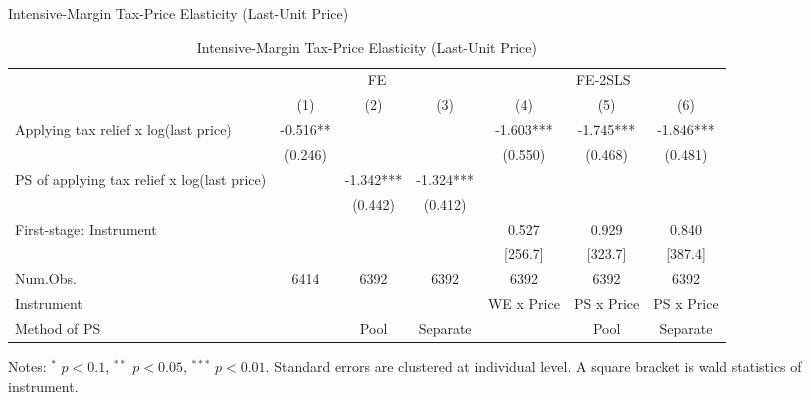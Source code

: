 \documentclass[
  ignorenonframetext,
  aspectratio=169,
]{beamer}
\begin{document}
\begin{frame}{Intensive-Margin Tax-Price Elasticity (Last-Unit Price)}
\protect\hypertarget{intensive-margin-tax-price-elasticity-last-unit-price}{}
\begin{table}

\caption{\label{tab:LastIntensive}Intensive-Margin Tax-Price Elasticity (Last-Unit Price)}
\centering
\fontsize{7}{9}\selectfont
\begin{threeparttable}
\begin{tabular}[t]{lcccccc}
\toprule
\multicolumn{1}{c}{ } & \multicolumn{3}{c}{FE} & \multicolumn{3}{c}{FE-2SLS} \\
\cmidrule(l{3pt}r{3pt}){2-4} \cmidrule(l{3pt}r{3pt}){5-7}
  & (1) & (2) & (3) & (4) & (5) & (6)\\
\midrule
Applying tax relief x log(last price) & -0.516** &  &  & -1.603*** & -1.745*** & -1.846***\\
 & (0.246) &  &  & (0.550) & (0.468) & (0.481)\\
PS of applying tax relief x log(last price) &  & -1.342*** & -1.324*** &  &  & \\
 &  & (0.442) & (0.412) &  &  & \\
\midrule
First-stage: Instrument &  &  &  & 0.527 & 0.929 & 0.840\\
 &  &  &  & [256.7] & [323.7] & [387.4]\\
Num.Obs. & 6414 & 6392 & 6392 & 6392 & 6392 & 6392\\
Instrument &  &  &  & WE x Price & PS x Price & PS x Price\\
Method of PS &  & Pool & Separate &  & Pool & Separate\\
\bottomrule
\end{tabular}
\begin{tablenotes}
\item Notes: $^{*}$ $p < 0.1$, $^{**}$ $p < 0.05$, $^{***}$ $p < 0.01$. Standard errors are clustered at individual level. A square bracket is wald statistics of instrument.
\end{tablenotes}
\end{threeparttable}
\end{table}
\end{frame}
\end{document}
